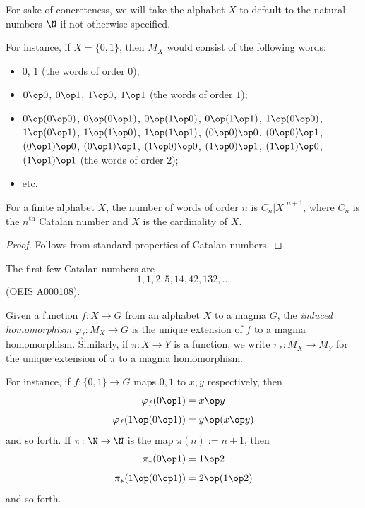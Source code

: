 For sake of concreteness, we will take the alphabet $X$ to default to the natural numbers $\N$ if not otherwise specified.

For instance, if $X = \{0,1\}$, then $M_X$ would consist of the following words:
\begin{itemize}
  \item $0$, $1$ (the words of order $0$);
  \item $0 \op 0$, $0 \op 1$, $1 \op 0$, $1 \op 1$ (the words of order $1$);
  \item $0 \op (0 \op 0)$, $0 \op (0 \op 1)$, $0 \op (1 \op 0)$, $0 \op (1 \op 1)$, $1 \op (0 \op 0)$, $1 \op (0 \op 1)$, $1 \op (1 \op 0)$, $1 \op (1 \op 1)$, $(0 \op 0) \op 0$, $(0 \op 0) \op 1$, $(0 \op 1) \op 0$, $(0 \op 1) \op 1$, $(1 \op 0) \op 0$, $(1 \op 0) \op 1$, $(1 \op 1) \op 0$, $(1 \op 1) \op 1$ (the words of order $2$);
  \item etc.
\end{itemize}

\begin{lemma} \leanok {}
  For a finite alphabet $X$, the number of words of order $n$ is $C_n |X|^{n+1}$, where $C_n$ is the $n^{\mathrm{th}}$ Catalan number and $X$ is the cardinality of $X$.
\end{lemma}

\begin{proof} \leanok
  Follows from standard properties of Catalan numbers.
\end{proof}

The first few Catalan numbers are
$$ 1, 1, 2, 5, 14, 42, 132, \dots$$
(\href{https://oeis.org/A000108}{OEIS A000108}).

\begin{definition}\label{induced-def}
  Given a function $f: X \to G$ from an alphabet $X$ to a magma $G$, the \emph{induced homomorphism} $\varphi_f: M_X \to G$ is the unique extension of $f$ to a magma homomorphism.
  Similarly, if $\pi \colon X \to Y$ is a function, we write $\pi_* \colon M_X \to M_Y$ for the unique extension of $\pi$ to a magma homomorphism.
\end{definition}

For instance, if $f : \{0,1\} \to G$ maps $0,1$ to $x,y$ respectively, then
$$ \varphi_f(0 \op 1) = x \op y$$
$$ \varphi_f(1 \op (0 \op 1)) = y \op (x \op y)$$
and so forth. If $\pi \colon \N \to \N$ is the map $\pi(n) := n+1$, then
$$ \pi_*(0 \op 1) = 1 \op 2$$
$$ \pi_*(1 \op (0 \op 1)) = 2 \op (1 \op 2)$$
and so forth.

